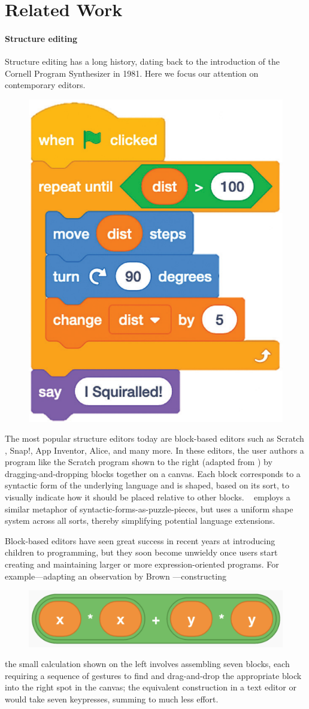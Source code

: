 \section{Related Work}\label{sec:related-work}

\paragraph{Structure editing}
Structure editing has a long history, dating back
to the introduction of the Cornell Program Synthesizer
\cite{Cornell} in 1981.
Here we focus our attention on contemporary editors.

\setlength\intextsep{0pt}
\begin{figure}
  \includegraphics[width=0.4\columnwidth]{img/scratch.png}
  \caption{}
  \label{fig:scratch}
\end{figure}
The most popular structure editors today
are block-based editors such as Scratch \cite{scratch}, Snap!,
App Inventor, Alice, and many more.
In these editors, the user authors a program
like the Scratch program shown to the right
(adapted from \cite{blocks-csed})
by dragging-and-dropping blocks together on a canvas.
Each block corresponds to a syntactic form of
the underlying language and is shaped, based on its
sort, to visually indicate how it should be placed relative
to other blocks.
\tylr~ employs a similar metaphor of syntactic-forms-as-puzzle-pieces,
but uses a uniform shape system across all sorts,
thereby simplifying potential language extensions.

Block-based editors have seen great success in recent years
at introducing children to programming, but they soon
become unwieldy once users start creating and maintaining
larger or more expression-oriented programs.
For example---adapting an observation by
Brown \etal \cite{no-keyboard-cripples}---constructing
\begin{figure}
  \includegraphics[width=0.4\columnwidth]{img/scratch-opseq.png}
\end{figure}
the small calculation shown on the left
involves assembling seven blocks, each
requiring a sequence of gestures to find and
drag-and-drop the appropriate block into the right spot
in the canvas;
the equivalent construction in a text editor or \tylr~ would
take seven keypresses, summing to much less effort.


